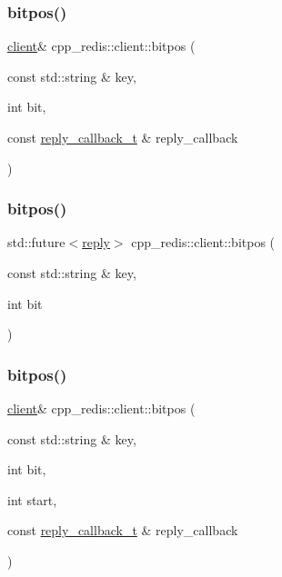 \subsubsection{\texorpdfstring{bitpos()}{bitpos()}\hspace{0.1cm}{\footnotesize\ttfamily [1/6]}}
{\footnotesize\ttfamily \hyperlink{classcpp__redis_1_1client}{client}\& cpp\+\_\+redis\+::client\+::bitpos (\begin{DoxyParamCaption}\item[{const std\+::string \&}]{key,  }\item[{int}]{bit,  }\item[{const \hyperlink{classcpp__redis_1_1client_a061a1140d36d2eaeda82b09a0bb3f9f2}{reply\+\_\+callback\+\_\+t} \&}]{reply\+\_\+callback }\end{DoxyParamCaption})}

\mbox{\label{classcpp__redis_1_1client_a5be47a4b3f9a36c4fab420468d50256a}} 
\subsubsection{\texorpdfstring{bitpos()}{bitpos()}\hspace{0.1cm}{\footnotesize\ttfamily [2/6]}}
{\footnotesize\ttfamily std\+::future$<$\hyperlink{classcpp__redis_1_1reply}{reply}$>$ cpp\+\_\+redis\+::client\+::bitpos (\begin{DoxyParamCaption}\item[{const std\+::string \&}]{key,  }\item[{int}]{bit }\end{DoxyParamCaption})}

\mbox{\label{classcpp__redis_1_1client_a8f6b7958a3094c975c3ca053b263c523}} 
\subsubsection{\texorpdfstring{bitpos()}{bitpos()}\hspace{0.1cm}{\footnotesize\ttfamily [3/6]}}
{\footnotesize\ttfamily \hyperlink{classcpp__redis_1_1client}{client}\& cpp\+\_\+redis\+::client\+::bitpos (\begin{DoxyParamCaption}\item[{const std\+::string \&}]{key,  }\item[{int}]{bit,  }\item[{int}]{start,  }\item[{const \hyperlink{classcpp__redis_1_1client_a061a1140d36d2eaeda82b09a0bb3f9f2}{reply\+\_\+callback\+\_\+t} \&}]{reply\+\_\+callback }\end{DoxyParamCaption})}

